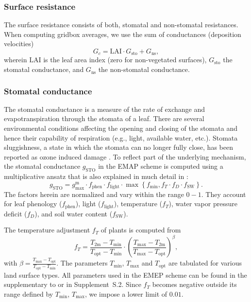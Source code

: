\documentclass[gmd, manuscript]{copernicus}
\begin{document}
\subsubsection{Surface resistance}
\label{subsubsec:Rc}
The surface resistance consists of both, stomatal and non-stomatal resistances. When computing gridbox averages, we use the sum of conductances (deposition velocities)
\begin{equation}
  G_c = \text{LAI} \cdot G_\text{sto} + G_\text{ns}, 
\end{equation}
wherein $\text{LAI}$ is the leaf area index (zero for non-vegetated surfaces), $G_\text{sto}$ the stomatal conductance, and $G_\text{ns}$ the non-stomatal conductance.

\subsubsection*{Stomatal conductance}
The stomatal conductance is a measure of the rate of  exchange and evapotranspiration through the stomata of a leaf. There are several environmental conditions affecting the opening and closing of the stomata and hence their capability of respiration (e.g., light, available water, etc.). Stomata sluggishness, a state in which the stomata can no longer fully close, has been reported as ozone induced damage \citep{SR:Hoshika2015}. To reflect part of the underlying mechanism, the stomatal conductance $g_\text{STO}$ in the EMAP scheme is computed using a multiplicative ansatz that is also explained in much detail in \citet{ICP:MappingManual2017}:
%
\begin{equation}
  g_\text{STO} = g^\text{m}_\text{max} \cdot f_\text{phen} \cdot f_\text{light} \cdot \max{\left\{f_\text{min}, f_T \cdot f_D \cdot f_\text{SW}\right\}}.
  \label{eq:stomatal}
\end{equation}
%
The factors herein are normalized and vary within the range $0-1$. They account for leaf phenology ($f_\text{phen}$), light ($f_\text{light}$), temperature ($f_T$), water vapor pressure deficit ($f_D$), and soil water content ($f_\text{SW}$).

The temperature adjustment $f_T$ of plants is computed from
%
\begin{equation}
  f_T = \frac{T_\text{2m}-T_\text{min}}{T_\text{opt}-T_\text{min}} \cdot \left(\frac{T_{\text{max}}-T_\text{2m}}{T_{\text{max}}-T_\text{opt}}\right)^\beta, 
\end{equation}
with $\beta = \frac{T_\text{max}-T_\text{opt}}{T_\text{opt}-T_\text{min}}$. The parameters $T_\text{min}$, $T_\text{max}$ and $T_\text{opt}$ are tabulated for various land surface types. All parameters used in the EMEP scheme can be found in the supplementary to \citet{ACP:Simpson2012} or in Supplement~S.2. Since $f_T$ becomes negative outside its range defined by $T_\text{min}$, $T_\text{max}$, we impose a lower limit of $0.01$.
\end{document}
